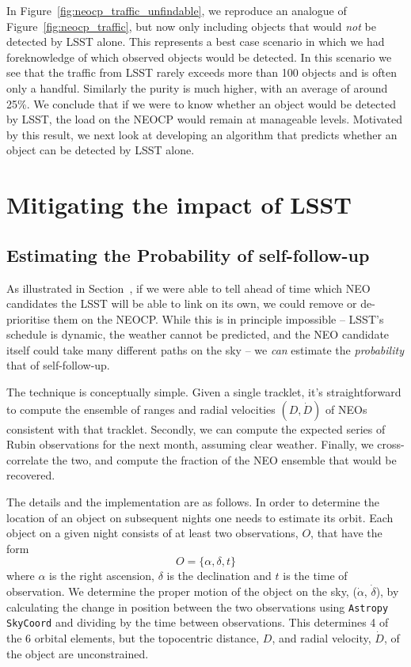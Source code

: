 \documentclass[twocolumn]{aastex631}
\begin{document}
In Figure~\ref{fig:neocp_traffic_unfindable}, we reproduce an analogue of Figure~\ref{fig:neocp_traffic}, but now only including objects that would \emph{not} be detected by LSST alone. This represents a best case scenario in which we had foreknowledge of which observed objects would be detected. In this scenario we see that the traffic from LSST rarely exceeds more than 100 objects and is often only a handful. Similarly the purity is much higher, with an average of around 25\%. We conclude that if we were to know whether an object would be detected by LSST, the load on the NEOCP would remain at manageable levels. Motivated by this result, we next look at developing an algorithm that predicts whether an object can be detected by LSST alone.

\section{Mitigating the impact of LSST}\label{sec:mitigation}

\subsection{Estimating the Probability of self-follow-up}\label{sec:pred_alg}
As illustrated in Section~\label{sec:no_LSST_detections}, if we were able to tell ahead of time which NEO candidates the LSST will be able to link on its own, we could remove or de-prioritise them on the NEOCP. While this is in principle impossible -- LSST's schedule is dynamic, the weather cannot be predicted, and the NEO candidate itself could take many different paths on the sky -- we \emph{can} estimate the \emph{probability} that of self-follow-up.

The technique is conceptually simple. Given a single tracklet, it's straightforward to compute the ensemble of ranges and radial velocities $(D, \dot{D})$ of NEOs consistent with that tracklet. Secondly, we can compute the expected series of Rubin observations for the next month, assuming clear weather. Finally, we cross-correlate the two, and compute the fraction of the NEO ensemble that would be recovered.

The details and the implementation are as follows. In order to determine the location of an object on subsequent nights one needs to estimate its orbit. Each object on a given night consists of at least two observations, $O$, that have the form
\begin{equation}
    O = \{ \alpha, \delta, t \}
\end{equation}
where $\alpha$ is the right ascension, $\delta$ is the declination and $t$ is the time of observation. We determine the proper motion of the object on the sky, ($\dot{\alpha}$, $\dot{\delta}$), by calculating the change in position between the two observations using \texttt{Astropy SkyCoord} and dividing by the time between observations. This determines 4 of the 6 orbital elements, but the topocentric distance, $D$, and radial velocity, $\dot{D}$, of the object are unconstrained.
\end{document}
